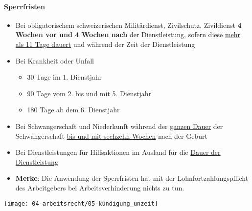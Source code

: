 \paragraph{Sperrfristen}
\begin{itemize}
    \item Bei obligatorischem schweizerischen Militärdienst, Zivilschutz, Zivildienst \textbf{4 Wochen vor und 4 Wochen nach} der Dienstleistung, sofern diese \underline{mehr als 11 Tage dauert} und während der Zeit der Dienstleistung
    \item Bei Krankheit oder Unfall
    \begin{itemize}
        \item 30 Tage im 1. Dienstjahr
        \item 90 Tage vom 2. bis und mit 5. Dienstjahr
        \item 180 Tage ab dem 6. Dienstjahr
    \end{itemize}
    \item Bei Schwangerschaft und Niederkunft während der \underline{ganzen Dauer} der Schwangerschaft \underline{bis und mit sechzehn Wochen} nach der Geburt
    \item Bei Dienstleistungen für Hilfsaktionen im Ausland für die \underline{Dauer der Dienstleistung}
    \item \textbf{Merke}: Die Anwendung der Sperrfristen hat mit der Lohnfortzahlungspflicht des Arbeitgebers bei Arbeitsverhinderung nichts zu tun.
\end{itemize}

\begin{center}
    \texttt{[image: 04-arbeitsrecht/05-kündigung\_unzeit]}
\end{center}

